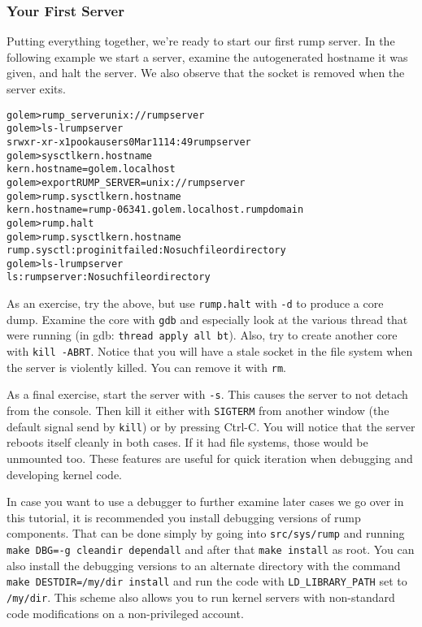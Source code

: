 \subsubsection{Your First Server}

Putting everything together, we're ready to start our first rump
server.  In the following example we start a server, examine the
autogenerated hostname it was given, and halt the server.  We also
observe that the socket is removed when the server exits.

{\footnotesize
\begin{alltt}
golem> rump_server unix://rumpserver
golem> ls -l rumpserver 
srwxr-xr-x  1 pooka  users  0 Mar 11 14:49 rumpserver
golem> sysctl kern.hostname
kern.hostname = golem.localhost
golem> export RUMP_SERVER=unix://rumpserver
golem> rump.sysctl kern.hostname
kern.hostname = rump-06341.golem.localhost.rumpdomain
golem> rump.halt
golem> rump.sysctl kern.hostname
rump.sysctl: prog init failed: No such file or directory
golem> ls -l rumpserver
ls: rumpserver: No such file or directory
\end{alltt}}

As an exercise, try the above, but use \texttt{rump.halt}
with \verb+-d+ to
produce a core dump.  Examine the core with \verb+gdb+
and especially look at the various thread that were running
(in gdb: \verb+thread apply all bt+).  Also, try to
create another core with \verb+kill -ABRT+.  Notice that you
will have a stale socket in the file system when the server is
violently killed.  You can remove it with \verb+rm+.

As a final exercise, start the server with \verb+-s+.
This causes the server to not detach from the console.  Then kill
it either with \verb+SIGTERM+ from another window
(the default signal send by \verb+kill+) or by pressing
Ctrl-C.  You will notice that the server reboots itself cleanly in
both cases.  If it had file systems, those would be unmounted too.
These features are useful for quick iteration when debugging
and developing kernel code.

In case you want to use a debugger to further examine later cases
we go over in this tutorial, it is recommended you install debugging
versions of rump components.  That can be done simply by going into
\verb+src/sys/rump+ and running \verb+make DBG=-g cleandir dependall+
and after that \verb+make install+
as root.  You can also install the debugging versions to an alternate
directory with the command \verb+make DESTDIR=/my/dir install+ and run
the code with \verb+LD_LIBRARY_PATH+ set to
\verb+/my/dir+.  This scheme also allows you to run
kernel servers with non-standard code modifications on a non-privileged
account.


